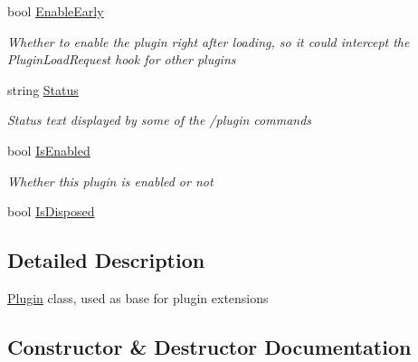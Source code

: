 \begin{DoxyCompactItemize}
bool \hyperlink{class_o_t_a_1_1_plugin_1_1_base_plugin_a752ecf7ec3fa008001b12d1728daa91b}{Enable\+Early}
\begin{DoxyCompactList}\small\item\em Whether to enable the plugin right after loading, so it could intercept the Plugin\+Load\+Request hook for other plugins \end{DoxyCompactList}\item 
string \hyperlink{class_o_t_a_1_1_plugin_1_1_base_plugin_a4d1e8d62e6d29cbb64146e5aa8b1c408}{Status}
\begin{DoxyCompactList}\small\item\em Status text displayed by some of the /plugin commands \end{DoxyCompactList}\item 
bool \hyperlink{class_o_t_a_1_1_plugin_1_1_base_plugin_a41182d2756dbb8db45e322b6f90a1a7e}{Is\+Enabled}
\begin{DoxyCompactList}\small\item\em Whether this plugin is enabled or not \end{DoxyCompactList}\item 
bool \hyperlink{class_o_t_a_1_1_plugin_1_1_base_plugin_aa2648c127cf574f711a4cc7dcceace5f}{Is\+Disposed}
\end{DoxyCompactItemize}


\subsection{Detailed Description}
\hyperlink{namespace_o_t_a_1_1_plugin}{Plugin} class, used as base for plugin extensions 



\subsection{Constructor \& Destructor Documentation}
\hypertarget{class_o_t_a_1_1_plugin_1_1_base_plugin_a26c9ff3a87d585ba9c9f3e95e48de987}{}
